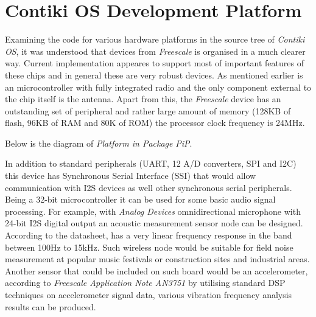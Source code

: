 {{\section{Contiki OS Development Platform}

  Examining the code for various hardware platforms in the source
 tree of \emph{Contiki OS}, it was understood that 
 devices from \emph{Freescale} is organised in a much clearer way.
 Current implementation appeares to support most of important
 features of these chips and in general these are very robust
 devices. As mentioned earlier  is an 
 microcontroller with fully integrated radio and the only component
 external to the chip itself is the antenna. Apart from this, the
 \emph{Freescale} device has an outstanding set of peripheral and
 rather large amount of memory (128KB of flash, 96KB of RAM and
 80K of ROM) the processor clock frequency is 24MHz.


 Below is the diagram of  \emph{Platform in Package}
 \emph{PiP}.

  In addition to standard peripherals (UART, 12 A/D converters,
 SPI and I2C) this device has Synchronous Serial Interface (SSI)
 that would allow communication with I2S devices as well other
 synchronous serial peripherals. Being a 32-bit microcontroller
 it can be used for some basic audio signal processing. For example,
 with \emph{Analog Devices}  omnidirectional microphone
 with 24-bit I2S digital output \cite{datasheet:adi:ADMP441} an
 acoustic measurement sensor node can be designed. According to the
 datasheet,  has a very linear frequency response in
 the band between 100Hz to 15kHz. Such wireless node would be
 suitable for field noise measurement at popular music festivals
 or construction sites and industrial areas.
 Another sensor that could be included on such board would be an
 accelerometer, according to \emph{Freescale Application
 Note AN3751} \cite{appnote:freescale:AN3751} by utilising standard
 DSP techniques on accelerometer signal data, various vibration
 frequency analysis results can be produced.


 
}}
